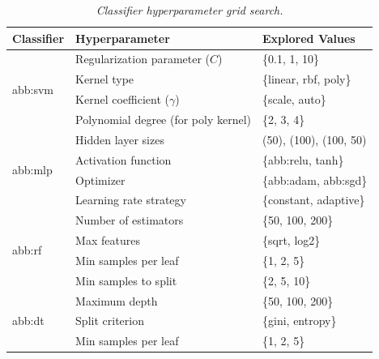 \begin{table}[H]
    \centering
    \renewcommand{\arraystretch}{1.5}
    \setlength{\tabcolsep}{8pt}
    \caption{\textit{Classifier hyperparameter grid search.}}
    \label{tab:hyperparams}
    \begin{tabular}{|p{1.5cm}|p{5.2cm}|p{5.3cm}|}
        \hline
        \textbf{Classifier} & \textbf{Hyperparameter} & \textbf{Explored Values} \\ \hline

        \multirow{4}{*}{\gls{abb:svm}} 
        & Regularization parameter ($C$) & \{0.1, 1, 10\} \\ \cline{2-3}
        & Kernel type & \{linear, rbf, poly\} \\ \cline{2-3}
        & Kernel coefficient ($\gamma$) & \{scale, auto\} \\ \cline{2-3}
        & Polynomial degree (for poly kernel) & \{2, 3, 4\} \\ \hline

        \multirow{4}{*}{\gls{abb:mlp}} 
        & Hidden layer sizes & (50), (100), (100, 50) \\ \cline{2-3}
        & Activation function & \{\gls{abb:relu}, tanh\} \\ \cline{2-3}
        & Optimizer & \{\gls{abb:adam}, \gls{abb:sgd}\} \\ \cline{2-3}
        & Learning rate strategy & \{constant, adaptive\} \\ \hline

        \multirow{4}{*}{\gls{abb:rf}} 
        & Number of estimators & \{50, 100, 200\} \\ \cline{2-3}
        & Max features & \{sqrt, log2\} \\ \cline{2-3}
        & Min samples per leaf & \{1, 2, 5\} \\ \cline{2-3}
        & Min samples to split & \{2, 5, 10\} \\ \hline

        \multirow{3}{*}{\gls{abb:dt}} 
        & Maximum depth & \{50, 100, 200\} \\ \cline{2-3}
        & Split criterion & \{gini, entropy\} \\ \cline{2-3}
        & Min samples per leaf & \{1, 2, 5\} \\ \hline
    \end{tabular}
\end{table}



\vspace{1cm}

